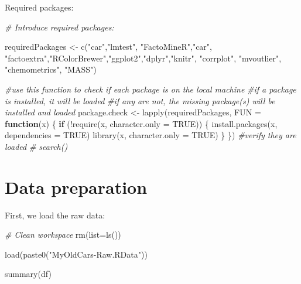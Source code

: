 \documentclass[
]{article}
\newenvironment{Shaded}{\begin{snugshade}}{\end{snugshade}}
\newcommand{\AttributeTok}[1]{\textcolor[rgb]{0.77,0.63,0.00}{#1}}
\newcommand{\CommentTok}[1]{\textcolor[rgb]{0.56,0.35,0.01}{\textit{#1}}}
\newcommand{\ConstantTok}[1]{\textcolor[rgb]{0.00,0.00,0.00}{#1}}
\newcommand{\ControlFlowTok}[1]{\textcolor[rgb]{0.13,0.29,0.53}{\textbf{#1}}}
\newcommand{\FunctionTok}[1]{\textcolor[rgb]{0.00,0.00,0.00}{#1}}
\newcommand{\NormalTok}[1]{#1}
\newcommand{\OtherTok}[1]{\textcolor[rgb]{0.56,0.35,0.01}{#1}}
\newcommand{\SpecialCharTok}[1]{\textcolor[rgb]{0.00,0.00,0.00}{#1}}
\newcommand{\StringTok}[1]{\textcolor[rgb]{0.31,0.60,0.02}{#1}}
\begin{document}
Required packages:

\begin{Shaded}
\begin{Highlighting}[]
\CommentTok{\# Introduce required packages:}

\NormalTok{requiredPackages }\OtherTok{\textless{}{-}} \FunctionTok{c}\NormalTok{(}\StringTok{"car"}\NormalTok{,}\StringTok{"lmtest"}\NormalTok{, }\StringTok{"FactoMineR"}\NormalTok{,}\StringTok{"car"}\NormalTok{, }\StringTok{"factoextra"}\NormalTok{,}\StringTok{"RColorBrewer"}\NormalTok{,}\StringTok{"ggplot2"}\NormalTok{,}\StringTok{"dplyr"}\NormalTok{,}\StringTok{"knitr"}\NormalTok{, }\StringTok{"corrplot"}\NormalTok{, }\StringTok{"mvoutlier"}\NormalTok{, }\StringTok{"chemometrics"}\NormalTok{, }\StringTok{"MASS"}\NormalTok{)}


\CommentTok{\#use this function to check if each package is on the local machine}
\CommentTok{\#if a package is installed, it will be loaded}
\CommentTok{\#if any are not, the missing package(s) will be installed and loaded}
\NormalTok{package.check }\OtherTok{\textless{}{-}} \FunctionTok{lapply}\NormalTok{(requiredPackages, }\AttributeTok{FUN =} \ControlFlowTok{function}\NormalTok{(x) \{}
  \ControlFlowTok{if}\NormalTok{ (}\SpecialCharTok{!}\FunctionTok{require}\NormalTok{(x, }\AttributeTok{character.only =} \ConstantTok{TRUE}\NormalTok{)) \{}
    \FunctionTok{install.packages}\NormalTok{(x, }\AttributeTok{dependencies =} \ConstantTok{TRUE}\NormalTok{)}
    \FunctionTok{library}\NormalTok{(x, }\AttributeTok{character.only =} \ConstantTok{TRUE}\NormalTok{)}
\NormalTok{  \}}
\NormalTok{\})}
\CommentTok{\#verify they are loaded}
\CommentTok{\# search()}
\end{Highlighting}
\end{Shaded}

\newpage

\hypertarget{data-preparation}{%
\section{Data preparation}\label{data-preparation}}

First, we load the raw data:

\begin{Shaded}
\begin{Highlighting}[]
\CommentTok{\# Clean workspace}
\FunctionTok{rm}\NormalTok{(}\AttributeTok{list=}\FunctionTok{ls}\NormalTok{())}

\FunctionTok{load}\NormalTok{(}\FunctionTok{paste0}\NormalTok{(}\StringTok{"MyOldCars{-}Raw.RData"}\NormalTok{))}

\FunctionTok{summary}\NormalTok{(df)}
\end{Highlighting}
\end{Shaded}
\end{document}
